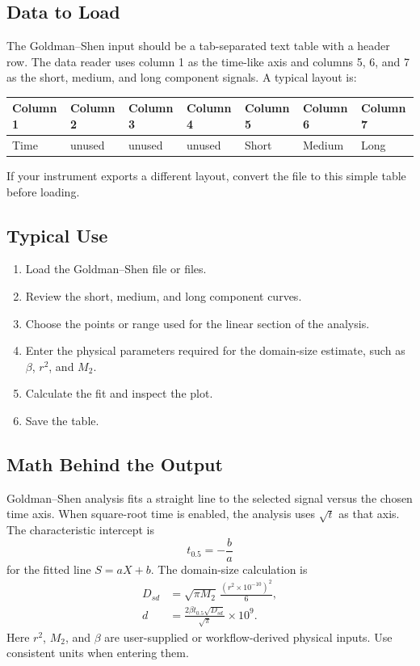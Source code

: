 \documentclass[11pt,a4paper]{article}
\newcommand{\Mtwo}{\ensuremath{M_2}}
\begin{document}
\subsection{Data to Load}
The Goldman--Shen input should be a tab-separated text table with a header row. The data reader uses column 1 as the time-like axis and columns 5, 6, and 7 as the short, medium, and long component signals. A typical layout is:
\begin{center}
\begin{tabular}{lllllll}
\toprule
Column 1 & Column 2 & Column 3 & Column 4 & Column 5 & Column 6 & Column 7 \\
\midrule
Time & unused & unused & unused & Short & Medium & Long \\
\bottomrule
\end{tabular}
\end{center}
If your instrument exports a different layout, convert the file to this simple table before loading.

\subsection{Typical Use}
\begin{enumerate}
  \item Load the Goldman--Shen file or files.
  \item Review the short, medium, and long component curves.
  \item Choose the points or range used for the linear section of the analysis.
  \item Enter the physical parameters required for the domain-size estimate, such as \(\beta\), \(r^2\), and \Mtwo{}.
  \item Calculate the fit and inspect the plot.
  \item Save the table.
\end{enumerate}

\subsection{Math Behind the Output}
Goldman--Shen analysis fits a straight line to the selected signal versus the chosen time axis. When square-root time is enabled, the analysis uses \(\sqrt{t}\) as that axis. The characteristic intercept is
\begin{equation}
t_{0.5}=-\frac{b}{a}
\end{equation}
for the fitted line \(S=aX+b\). The domain-size calculation is
\begin{align}
D_{sd} &= \sqrt{\pi\Mtwo}\,\frac{(r^2\times10^{-10})^2}{6},\\
d &= \frac{2\beta t_{0.5}\sqrt{D_{sd}}}{\sqrt{\pi}}\times10^9.
\end{align}
Here \(r^2\), \Mtwo{}, and \(\beta\) are user-supplied or workflow-derived physical inputs. Use consistent units when entering them.
\end{document}
